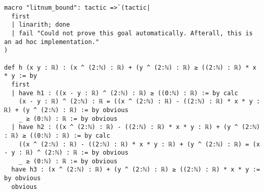 \documentclass{article}
\begin{document}
\begin{tcolorbox}[colback=white!10, width=\linewidth]
\begin{lstlisting}[language=Lean4]
macro "litnum_bound": tactic =>`(tactic|
  first
  | linarith; done
  | fail "Could not prove this goal automatically. Afterall, this is an ad hoc implementation."
)

def h (x y : ℝ) : (x ^ (2:ℕ) : ℝ) + (y ^ (2:ℕ) : ℝ) ≥ ((2:ℕ) : ℝ) * x * y := by
  first
  | have h1 : ((x - y : ℝ) ^ (2:ℕ) : ℝ) ≥ ((0:ℕ) : ℝ) := by calc
    (x - y : ℝ) ^ (2:ℕ) : ℝ = ((x ^ (2:ℕ) : ℝ) - ((2:ℕ) : ℝ) * x * y : ℝ) + (y ^ (2:ℕ) : ℝ) := by obvious
    _ ≥ (0:ℕ) : ℝ := by obvious
  | have h2 : ((x ^ (2:ℕ) : ℝ) - ((2:ℕ) : ℝ) * x * y : ℝ) + (y ^ (2:ℕ) : ℝ) ≥ ((0:ℕ) : ℝ) := by calc
    ((x ^ (2:ℕ) : ℝ) - ((2:ℕ) : ℝ) * x * y : ℝ) + (y ^ (2:ℕ) : ℝ) = (x - y : ℝ) ^ (2:ℕ) : ℝ := by obvious
    _ ≥ (0:ℕ) : ℝ := by obvious
  have h3 : (x ^ (2:ℕ) : ℝ) + (y ^ (2:ℕ) : ℝ) ≥ ((2:ℕ) : ℝ) * x * y := by obvious
  obvious

\end{lstlisting}
\end{tcolorbox}
\end{document}
